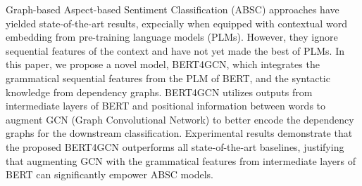 Graph-based Aspect-based Sentiment Classification (ABSC) approaches have yielded state-of-the-art results, expecially when equipped with contextual word embedding from pre-training language models (PLMs). However, they ignore sequential features of the context and have not yet made the best of PLMs. In this paper, we propose a novel model, BERT4GCN, which integrates the grammatical sequential features from the PLM of BERT, and the syntactic knowledge from dependency graphs. BERT4GCN utilizes outputs from intermediate layers of BERT and positional information between words to augment GCN (Graph Convolutional Network) to better encode the dependency graphs for the downstream classification. Experimental results demonstrate that the proposed BERT4GCN outperforms all state-of-the-art baselines, justifying that augmenting GCN with the grammatical features from intermediate layers of BERT can significantly empower ABSC models.
